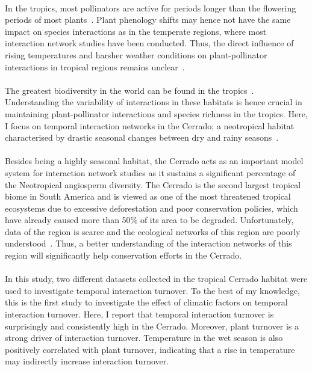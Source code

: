 \documentclass[11pt]{article}
\begin{document}
\\
In the tropics, most pollinators are active for periods longer than the flowering periods of most plants~\citep{Biesmeijer2006}. Plant phenology shifts may hence not have the same impact on species interactions as in the temperate regions, where most interaction network studies have been conducted. Thus, the direct influence of rising temperatures and harsher weather conditions on plant-pollinator interactions in tropical regions remains unclear~\citep{Schweiger2010}.  \\
\\
The greatest biodiversity in the world can be found in the tropics~\citep{Brown2014}. Understanding the variability of interactions in these habitats is hence crucial in maintaining plant-pollinator interactions and species richness in the tropics. Here, I focus on temporal interaction networks in the Cerrado; a neotropical habitat characterised by drastic seasonal changes between dry and rainy seasons~\citep{Kricher2011}.\\
\\
Besides being a highly seasonal habitat, the Cerrado acts as an important model system for interaction network studies as it sustains a significant percentage of the Neotropical angiosperm diversity. The Cerrado is the second largest tropical biome in South America and is viewed as one of the most threatened tropical ecosystems due to excessive deforestation and poor conservation policies, which have already caused more than 50\% of its area to be degraded. Unfortunately, data of the region is scarce and the ecological networks of this region are poorly understood~\citep{Myers2000, KLINK2005}. Thus, a better understanding of the interaction networks of this region will significantly help conservation efforts in the Cerrado.\\
\\
In this study, two different datasets collected in the tropical Cerrado habitat were used to investigate temporal interaction turnover. To the best of my knowledge, this is the first study to investigate the effect of climatic factors on temporal interaction turnover. Here, I report that temporal interaction turnover is surprisingly and consistently high in the Cerrado. Moreover, plant turnover is a strong driver of interaction turnover. Temperature in the wet season is also positively correlated with plant turnover, indicating that a rise in temperature may indirectly increase interaction turnover. 
\end{document}

